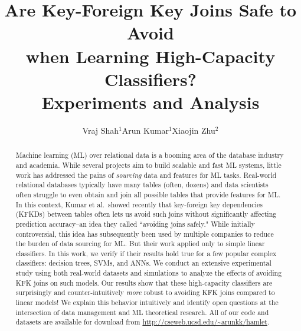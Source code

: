 \documentclass{vldb}
\title{Are Key-Foreign Key Joins Safe to Avoid \\when Learning High-Capacity Classifiers?\\ \lbrack Experiments and Analysis\rbrack }
\author{
\alignauthor Vraj Shah$^1$\hspace{20mm}Arun Kumar$^1$\hspace{20mm}Xiaojin Zhu$^2$\\
\affaddr{\vspace{2mm}$^1$University of California, San Diego\hspace{20mm}$^2$University of Wisconsin-Madison}
\email{\{vps002, arunkk\}@eng.ucsd.edu, jerryzhu@cs.wisc.edu}
}
\begin{document}
\maketitle

\begin{abstract}
Machine learning (ML) over relational data is a booming area of the database industry and 
academia. While several projects aim to build scalable and fast ML systems, little work has 
addressed the pains of \textit{sourcing} data and features for ML tasks. 
Real-world relational databases typically have many tables (often, dozens) and data scientists 
often struggle to even obtain and join all possible tables that provide features for ML. 
In this context, Kumar et al.~showed recently that key-foreign key dependencies (KFKDs) 
between tables often lets us avoid such joins without significantly affecting prediction 
accuracy--an idea they called ``avoiding joins safely." While initially controversial, this idea 
has subsequently been used by multiple companies to reduce the burden of data sourcing for ML.
But their work applied only to simple linear classifiers. In this work, we verify if their results 
hold true for a few popular complex classifiers: decision trees, SVMs, and ANNs. We conduct an 
extensive experimental study using both real-world datasets and simulations to analyze the 
effects of avoiding KFK joins on such models. Our results show that these high-capacity classifiers are 
surprisingly and counter-intuitively \textit{more} robust to avoiding KFK joins compared to linear 
models! We explain this behavior intuitively and identify open questions at the intersection 
of data management and ML theoretical research. All of our code and datasets are available for 
download from \url{http://cseweb.ucsd.edu/~arunkk/hamlet}.
\end{abstract}
\end{document}
